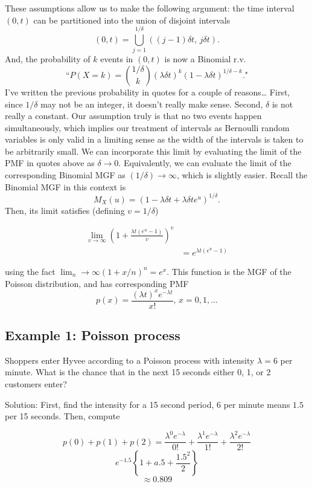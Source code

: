 \documentclass[]{book}
\begin{document}
These assumptions allow us to make the following argument: the time
interval \((0,t)\) can be partitioned into the union of disjoint
intervals
\[(0,t) = \bigcup_{j=1}^{1/\delta} ((j-1)\delta t, \, j\delta t).\] And,
the probability of \(k\) events in \((0,t)\) is now a Binomial r.v.
\[\text{``}P(X = k) = {1/\delta\choose k} (\lambda \delta t)^k (1- \lambda \delta t)^{1/\delta - k}.\text{"}\]
I've written the previous probability in quotes for a couple of
reasons\ldots{} First, since \(1/\delta\) may not be an integer, it
doesn't really make sense. Second, \(\delta\) is not really a constant.
Our assumption truly is that no two events happen simultaneously, which
implies our treatment of intervals as Bernoulli random variables is only
valid in a limiting sense as the width of the intervals is taken to be
arbitrarily small. We can incorporate this limit by evaluating the limit
of the PMF in quotes above as \(\delta \rightarrow 0\). Equivalently, we
can evaluate the limit of the corresponding Binomial MGF as
\((1/\delta)\rightarrow \infty\), which is slightly easier. Recall the
Binomial MGF in this context is
\[M_X(u) = (1- \lambda \delta t + \lambda \delta t e^u)^{1/\delta}.\]
Then, its limit satisfies (defining \(v = 1/\delta\))

\begin{align*}
\lim_{v \rightarrow \infty} \left(1+ \frac{\lambda t(e^u -1)}{v}\right)^{v}\\
& = e^{\lambda t(e^u - 1)}
\end{align*}

using the fact \(\lim_n\rightarrow \infty (1+x/n)^n = e^x.\) This
function is the MGF of the Poisson distribution, and has corresponding
PMF \[p(x) = \frac{(\lambda t)^x e^{-\lambda t}}{x!},\, x=0,1,\ldots\]

\subsection{Example 1: Poisson process}\label{example-1-poisson-process}

Shoppers enter Hyvee according to a Poisson process with intensity
\(\lambda = 6\) per minute. What is the chance that in the next 15
seconds either 0, 1, or 2 customers enter?

Solution: First, find the intensity for a 15 second period, \(6\) per
minute means \(1.5\) per 15 seconds. Then, compute

\[p(0)+p(1)+p(2) = \frac{\lambda^0e^{-\lambda}}{0!}+\frac{\lambda^1e^{-\lambda}}{1!}+\frac{\lambda^2e^{-\lambda}}{2!}\]
\[e^{-1.5}\left\{1+a.5 + \frac{1.5^2}{2}\right\}\] \[ \approx 0.809\]
\end{document}
